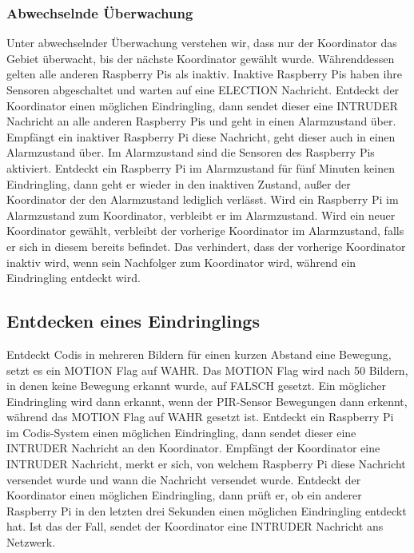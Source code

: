 \documentclass[journal]{IEEEtran}
\begin{document}
\subsubsection{Abwechselnde Überwachung}

Unter abwechselnder Überwachung verstehen wir, dass nur der Koordinator das Gebiet überwacht, bis der nächste Koordinator gewählt wurde. Währenddessen gelten alle anderen Raspberry Pis als inaktiv. Inaktive Raspberry Pis haben ihre Sensoren abgeschaltet und warten auf eine \MakeUppercase{election} Nachricht. Entdeckt der Koordinator einen möglichen Eindringling, dann sendet dieser eine \MakeUppercase{intruder} Nachricht an alle anderen Raspberry Pis und geht in einen Alarmzustand über. Empfängt ein inaktiver Raspberry Pi diese Nachricht, geht dieser auch in einen Alarmzustand über. Im Alarmzustand sind die Sensoren des Raspberry Pis aktiviert. Entdeckt ein Raspberry Pi im Alarmzustand für fünf Minuten keinen Eindringling, dann geht er wieder in den inaktiven Zustand, außer der Koordinator der den Alarmzustand lediglich verlässt. Wird ein Raspberry Pi im Alarmzustand zum Koordinator, verbleibt er im Alarmzustand. Wird ein neuer Koordinator gewählt, verbleibt der vorherige Koordinator im Alarmzustand, falls er sich in diesem bereits befindet. Das verhindert, dass der vorherige Koordinator inaktiv wird, wenn sein Nachfolger zum Koordinator wird, während ein Eindringling entdeckt wird.

\subsection{Entdecken eines Eindringlings}

Entdeckt Codis in mehreren Bildern für einen kurzen Abstand eine Bewegung, setzt es ein \MakeUppercase{motion} Flag auf WAHR. Das \MakeUppercase{motion} Flag wird nach 50 Bildern, in denen keine Bewegung erkannt wurde, auf FALSCH gesetzt. Ein möglicher Eindringling wird dann erkannt, wenn der PIR-Sensor Bewegungen dann erkennt, während das \MakeUppercase{motion} Flag auf WAHR gesetzt ist. Entdeckt ein Raspberry Pi im Codis-System einen möglichen Eindringling, dann sendet dieser eine \MakeUppercase{intruder} Nachricht an den Koordinator. Empfängt der Koordinator eine \MakeUppercase{intruder} Nachricht, merkt er sich, von welchem Raspberry Pi diese Nachricht versendet wurde und wann die Nachricht versendet wurde. Entdeckt der Koordinator einen möglichen Eindringling, dann prüft er, ob ein anderer Raspberry Pi in den letzten drei Sekunden einen möglichen Eindringling entdeckt hat. Ist das der Fall, sendet der Koordinator eine \MakeUppercase{intruder} Nachricht ans Netzwerk.
\end{document}
